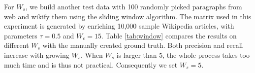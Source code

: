 For $W_s$, we build another test data with 100 randomly picked paragraphs
from web and wikify them using the sliding window algorithm. The matrix used in
this experiment is generated by enriching 10,000 sample Wikipedia articles, 
with parameters $\tau= 0.5$ and $W_c=15$. Table \ref{tab:window} compares 
the results on different $W_s$ with the manually created ground truth.
Both precision and recall increase with growing $W_s$. 
When $W_s$ is larger than 5, the whole process takes too much time and 
is thus not practical. Consequently we set $W_s = 5$.

